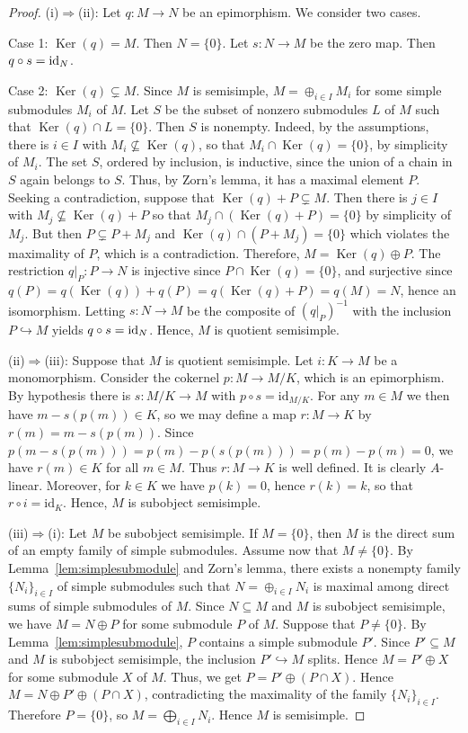 \documentclass[12pt]{amsart}
\theoremstyle{definition}
\newcommand{\id}{{\rm id}}
\DeclareMathOperator{\Ker}{Ker}
\begin{document}
\begin{proof}
(i)$\Rightarrow$(ii):
Let $q : M \to N$ be an epimorphism. We consider 
two cases. 

Case 1: $\Ker(q)=M$. Then $N = \{ 0 \}$.
Let $s : N \to M$ be the zero map. 
Then $q \circ s = \id_N$.

Case 2: $\Ker(q) \subsetneq M$.
Since $M$ is semisimple, $M=\oplus_{i\in I} M_i$ 
for some simple submodules $M_i$ of $M$.
Let $S$ be the subset of nonzero submodules $L$
of $M$ such that $\Ker(q) \cap L = \{ 0 \}$.
Then $S$ is nonempty. Indeed,
by the assumptions, there is $i \in I$ with
$M_i \not \subseteq \Ker(q)$, so that 
$M_i \cap \Ker(q) = \{ 0 \}$, by simplicity of $M_i$.
The set $S$, ordered by inclusion, is inductive,
since the union of a chain in $S$ again belongs to $S$.
Thus, by Zorn's lemma, it has a maximal element $P$.
Seeking a contradiction, suppose that 
$\Ker(q) + P \subsetneq M$. Then there is $j \in I$
with $M_j \not \subseteq \Ker(q) + P$ so that 
$M_j \cap (\Ker(q) + P) = \{ 0 \}$ by simplicity 
of $M_j$. But then $P \subsetneq P + M_j$ and 
$\Ker(q) \cap (P + M_j) = \{ 0 \}$ which violates 
the maximality of $P$, which is a contradiction.
Therefore, $M = \Ker(q) \oplus P$.
The restriction $q|_P : P \to N$ is injective since 
$P \cap \Ker(q) = \{ 0 \}$, and surjective since 
$q(P) = q(\Ker(q)) + q(P) = q( \Ker(q) + P ) =
q(M) = N$, hence an isomorphism. 
Letting $s : N \to M$ be the composite of $(q|_P)^{-1}$ with the inclusion $P \hookrightarrow M$ yields 
$q \circ s=\id_N$. 
Hence, $M$ is quotient semisimple.

(ii)$\Rightarrow$(iii):
Suppose that $M$ is quotient
semisimple. Let $i:K \to M$ be a monomorphism.  
Consider the cokernel $p : M \to M/K$, which is an 
epimorphism. By hypothesis there is  
$s : M/K \to M$ with 
$p \circ s=\mathrm{id}_{M/K}$. 
For any $m\in M$ we then have 
$m- s(p(m)) \in K$, so we 
may define a map $r:M\to K$ by 
$r(m)=m-s(p(m))$. 
Since $p(m - s(p(m))) = p(m)-p(s(p(m))) = 
p(m) - p(m) = 0$,
we have $r(m) \in K$ for all $m \in M$.
Thus $r : M \to K$ is well defined. It is clearly 
$A$-linear. Moreover, for $k\in K$ we have 
$p(k)=0$, hence $r(k)=k$, so that 
$r \circ i=\mathrm{id}_K$.
Hence, $M$ is subobject semisimple.

(iii)$\Rightarrow$(i): 
Let $M$ be subobject semisimple.
If $M = \{0\}$, then $M$ is the direct sum of an 
empty family of simple submodules.
Assume now that $M \neq \{ 0 \}$.
By Lemma~\ref{lem:simplesubmodule} and Zorn's lemma,
there exists a nonempty family $\{N_i\}_{i\in I}$ of simple 
submodules such that $N = \oplus_{i\in I} N_i$
is maximal among direct sums of simple submodules of $M$.
Since $N\subseteq M$ and $M$ is subobject semisimple, we have
$M = N\oplus P$ for some submodule $P$ of $M$.
Suppose that $P \neq \{ 0 \}$.
By Lemma~\ref{lem:simplesubmodule}, $P$ contains a simple 
submodule $P'$.
Since $P'\subseteq M$ and $M$ is subobject semisimple, the inclusion $P'\hookrightarrow M$ splits.
Hence $M = P'\oplus X$ for some submodule $X$ of $M$.
Thus, we get
$P = P'\oplus (P\cap X)$.
Hence $M = N \oplus P'\oplus (P\cap X)$,
contradicting the maximality of the family $\{N_i\}_{i\in I}$.
Therefore $P = \{0\}$, so $M=\bigoplus_{i\in I} N_i$.
Hence $M$ is semisimple.
\end{proof}
\end{document}
